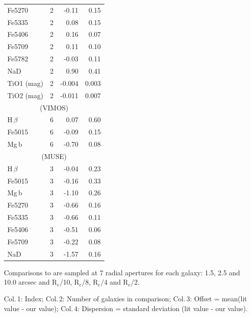 \begin{table}
\begin{threeparttable}
\begin{tabular*}{0.8\textwidth}{@{\extracolsep{\fill}}l r r r}
					Fe5270 		& 2 		& -0.11\leavevmode\phantom{0}& 0.15\leavevmode\phantom{0}	\\
					Fe5335 		& 2 		& 0.08\leavevmode\phantom{0}& 0.15\leavevmode\phantom{0}	\\
					Fe5406 		& 2 		& 0.16\leavevmode\phantom{0}& 0.07\leavevmode\phantom{0}	\\
					Fe5709 		& 2 		& 0.11\leavevmode\phantom{0}& 0.10\leavevmode\phantom{0}	\\
					Fe5782 		& 2 		& -0.03\leavevmode\phantom{0}& 0.11\leavevmode\phantom{0}	\\
					NaD 		& 2 		& 0.90\leavevmode\phantom{0}& 0.41\leavevmode\phantom{0}	\\
					TiO1 (mag)	& 2 		& -0.004	& 0.003	\\
					TiO2 (mag)	& 2 		& -0.011	& 0.007	\\
					\hline
					\multicolumn{4}{c}{\citet{Ogando2008} (VIMOS)} \\
					\hline
					H\,$\beta$ 	& 6 		& 0.07\leavevmode\phantom{0}& 0.60\leavevmode\phantom{0}	\\
					Fe5015 		& 6 		& -0.09\leavevmode\phantom{0}& 0.15\leavevmode\phantom{0}	\\
					Mg\,b 		& 6 		& -0.70\leavevmode\phantom{0}& 0.08\leavevmode\phantom{0}	\\
					\hline
					\multicolumn{4}{c}{\citet{Ogando2008} (MUSE)} \\
					\hline
					H\,$\beta$ 	& 3 		& -0.04\leavevmode\phantom{0}& 0.23\leavevmode\phantom{0}	\\ 
					Fe5015 		& 3 		& -0.16\leavevmode\phantom{0}& 0.33\leavevmode\phantom{0}	\\ 
					Mg\,b 		& 3 		& -1.10\leavevmode\phantom{0}& 0.26\leavevmode\phantom{0}	\\
					Fe5270 		& 3 		& -0.66\leavevmode\phantom{0}& 0.16\leavevmode\phantom{0}	\\
					Fe5335 		& 3 		& -0.66\leavevmode\phantom{0}& 0.11\leavevmode\phantom{0}	\\
					Fe5406 		& 3 		& -0.51\leavevmode\phantom{0}& 0.06\leavevmode\phantom{0}	\\
					Fe5709 		& 3 		& -0.22\leavevmode\phantom{0}& 0.08\leavevmode\phantom{0}	\\
					NaD 		& 3 		& -1.57\leavevmode\phantom{0}& 0.16\leavevmode\phantom{0}	\\
					\hline
					\hline
				\end{tabular*}
				\begin{tablenotes}
				\footnotesize
				\note Comparisons to \citet{Rampazzo2005} are sampled at 7 radial apertures for each galaxy: 1.5, 2.5 and 10.0 arcsec and R$_e$/10, R$_e$/8, R$_e$/4 and R$_e$/2. 
				\item Col.\,1: Index; Col.\,2: Number of galaxies in comparison; Col.\,3: Offset = mean(lit value - our value); Col.\,4: Dispersion = standard deviation (lit value - our value).
				\end{tablenotes}
			\end{threeparttable}
			\end{table}

